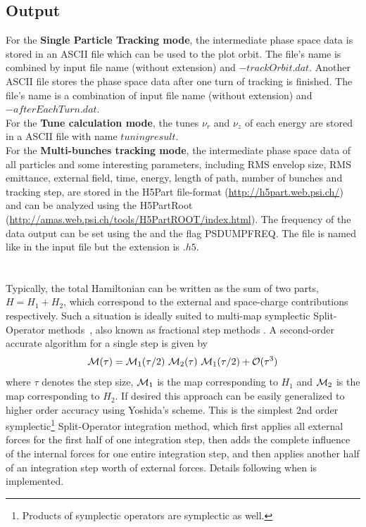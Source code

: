 \subsection{Output}  
For the {\bfseries Single Particle Tracking mode}, the intermediate phase space data is stored in an ASCII file which can be used to
the plot orbit. The file's name is combined by input file name (without extension) and $-trackOrbit.dat$.
Another ASCII file stores the phase space data after one turn of tracking is finished. The file's name is a combination of input file name 
(without extension) and $-afterEachTurn.dat$.\\
 
For the {\bfseries Tune calculation mode}, the tunes $\nu_r$ and $\nu_z$ of each energy are stored in a ASCII file with name 
$tuningresult$.\\

For the {\bfseries Multi-bunches tracking mode}, the intermediate phase space data of all particles and some interesting parameters, 
including RMS envelop size, RMS emittance, external field, time, energy, length of path, number of bunches and 
tracking step, are stored in the H5Part file-format (\url{http://h5part.web.psi.ch/}) and can be analyzed
using the H5PartRoot (\url{http://amas.web.psi.ch/tools/H5PartROOT/index.html}). The frequency 
of the data output can be set using the  and the flag PSDUMPFREQ. 
The file is named like in the input file but the extension is $.h5$. 

\section{\opalmap} \label{sec:SplitOperatorMethods}

Typically, the total Hamiltonian can be written as the sum of two parts, $H = H_{1} + H_{2}$,
which correspond to the external and space-charge contributions respectively.
Such a situation is ideally suited to multi-map
symplectic Split-Operator methods~\cite{forestall}, also known as fractional step methods \cite{SanzSerna}.
A second-order accurate algorithm for a single step is given by
\begin{equation} \label{eq:splitOper1}
{\cal M}(\tau)={\cal M}_1(\tau/2)~{\cal M}_2(\tau)~{\cal M}_1(\tau/2) + \mathcal{O}(\tau^3)
\end{equation}
where $\tau$ denotes the step size, ${\cal M}_1$ is the map corresponding
to $H_{1}$  and ${\cal M}_2$ is the map corresponding to $H_{2}$.
If desired this approach can be
easily generalized to higher order accuracy using Yoshida's
scheme. %
This is the simplest 2nd order symplectic\footnote{Products of symplectic operators are symplectic as well.} Split-Operator integration method, which first applies all external forces for the first half of one integration step, then adds the complete influence of the internal forces for one entire integration step, and then applies another half of an integration step worth of external forces.
Details following when \opalmap is implemented.









